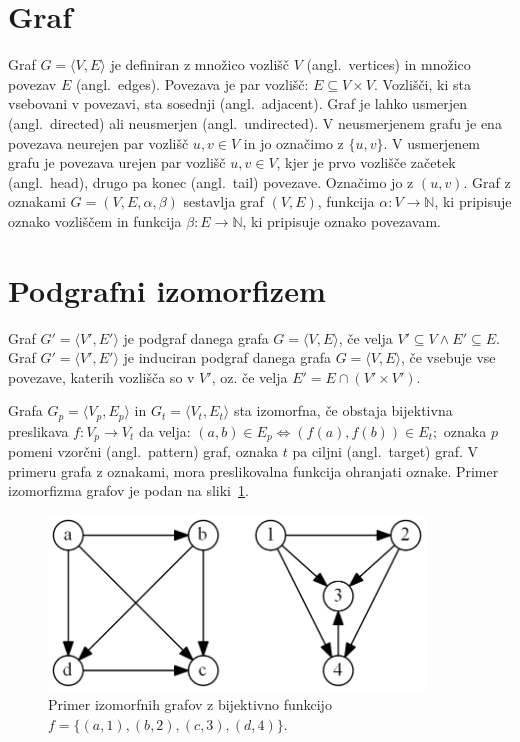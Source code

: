 \documentclass[a4paper, 12pt, ]{book}
\begin{document}
	\section{Graf}
	Graf $G = \langle V, E \rangle$ je definiran z množico vozlišč $V$ (angl.~vertices) in množico povezav $E$ (angl.~edges). Povezava je par vozlišč: 
	$E \subseteq V \times V$.
	Vozlišči, ki sta vsebovani v povezavi, sta sosednji (angl.~adjacent). Graf je lahko usmerjen (angl.~directed) ali neusmerjen
	(angl.~undirected). V neusmerjenem
	grafu je ena povezava neurejen par vozlišč $u, v \in V$ in jo označimo z $\{u, v\}$. V usmerjenem grafu je povezava urejen par 
	vozlišč $u, v \in V$, kjer je prvo vozlišče začetek (angl.~head), drugo pa konec (angl.~tail) povezave. Označimo jo z $(u, v)$.
	Graf z oznakami $G = (V, E, \alpha, \beta)$ sestavlja graf $(V, E)$, funkcija $\alpha: V \to \mathbb{N} $, ki pripisuje oznako
	vozliščem in funkcija $\beta: E \rightarrow \mathbb{N}$, ki pripisuje oznako povezavam.



	\section{Podgrafni izomorfizem}
	Graf $G' = \langle V', E' \rangle$ je podgraf danega grafa $G = \langle V, E \rangle$, če velja $V' \subseteq V \wedge E' \subseteq E$. 
	Graf $G' = \langle V', E' \rangle$ je induciran podgraf danega grafa $G = \langle V, E \rangle$, če vsebuje vse povezave, katerih vozlišča so
	v $V'$, oz. če velja $E' = E \cap (V' \times V')$.

	Grafa $G_p = \langle V_p, E_p \rangle $ in $G_t = \langle V_t, E_t \rangle$ sta izomorfna, če obstaja bijektivna preslikava $f: V_p \to V_t$ da velja: 
	$(a,b) \in E_p \Leftrightarrow (f(a), f(b)) \in E_t;$
	oznaka $p$ pomeni vzorčni (angl.~pattern) graf, oznaka $t$ pa ciljni (angl.~target) graf. V primeru grafa z oznakami, mora preslikovalna funkcija
	ohranjati oznake. Primer izomorfizma grafov je podan na sliki~\ref{pic_iso}.

	\begin{figure}
	\begin{center}
	\includegraphics[width=10cm]{img/graph_izomorph.png}
	\end{center}
	\caption{Primer izomorfnih grafov z bijektivno funkcijo $f = \{(a, 1), (b, 2), (c, 3), (d, 4)\}$.}
	\label{pic_iso}
	\end{figure}
\end{document}
